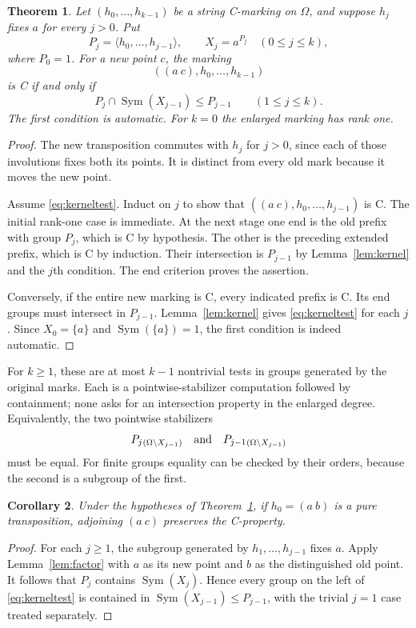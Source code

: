 \documentclass[a4paper,11pt]{article}
\newcommand{\Sym}{\operatorname{Sym}}\newcommand{\Alt}{\operatorname{Alt}}
\newcommand{\gen}[1]{\langle#1\rangle}
\newtheorem{theorem}{Theorem}\newtheorem{lemma}[theorem]{Lemma}
\newtheorem{corollary}[theorem]{Corollary}
\begin{document}
\begin{theorem}\label{thm:leaf}
Let $(h_0,\ldots,h_{k-1})$ be a string C-marking on $\Omega$, and
suppose $h_j$ fixes $a$ for every $j>0$. Put
\[
 P_j=\gen{h_0,\ldots,h_{j-1}},\qquad X_j=a^{P_j}
 \quad(0\leq j\leq k),
\]
where $P_0=1$. For a new point $c$, the marking
\[
 ((a\ c),h_0,\ldots,h_{k-1})
\]
is C if and only if
\begin{equation}\label{eq:kerneltest}
 P_j\cap\Sym(X_{j-1})\leq P_{j-1}
 \qquad(1\leq j\leq k).
\end{equation}
The first condition is automatic. For $k=0$ the enlarged marking has rank one.
\end{theorem}
\begin{proof}
The new transposition commutes with $h_j$ for $j>0$, since each of
those involutions fixes both its points. It is distinct from every old
mark because it moves the new point.

Assume \eqref{eq:kerneltest}. Induct on $j$ to show that
$((a\ c),h_0,\ldots,h_{j-1})$ is C. The initial rank-one case is
immediate. At the next stage one end is the old prefix with group $P_j$,
which is C by hypothesis. The other is the preceding extended prefix,
which is C by induction. Their intersection is $P_{j-1}$ by
Lemma~\ref{lem:kernel} and the $j$th condition. The end criterion
proves the assertion.

Conversely, if the entire new marking is C, every indicated prefix is C.
Its end groups must intersect in $P_{j-1}$. Lemma~\ref{lem:kernel}
gives \eqref{eq:kerneltest} for each $j$. Since $X_0=\{a\}$ and
$\Sym(\{a\})=1$, the first condition is indeed automatic.
\end{proof}

For $k\geq1$, these are at most $k-1$ nontrivial tests in groups generated by the original
marks. Each is a pointwise-stabilizer computation followed by containment;
none asks for an intersection property in the enlarged degree. Equivalently,
the two pointwise stabilizers
\[
 P_j{}_{(\Omega\setminus X_{j-1})}
 \quad\hbox{and}\quad
 P_{j-1}{}_{(\Omega\setminus X_{j-1})}
\]
must be equal. For finite groups equality can be checked by their orders,
because the second is a subgroup of the first.

\begin{corollary}\label{cor:pure}
Under the hypotheses of Theorem~\ref{thm:leaf}, if $h_0=(a\ b)$
is a pure transposition, adjoining $(a\ c)$ preserves the C-property.
\end{corollary}
\begin{proof}
For each $j\geq1$, the subgroup generated by $h_1,\ldots,h_{j-1}$
fixes $a$. Apply Lemma~\ref{lem:factor} with $a$ as its new point
and $b$ as the distinguished old point. It follows that
$P_j$ contains $\Sym(X_j)$. Hence every group on the left of
\eqref{eq:kerneltest} is contained in $\Sym(X_{j-1})\leq P_{j-1}$,
with the trivial $j=1$ case treated separately.
\end{proof}
\end{document}
